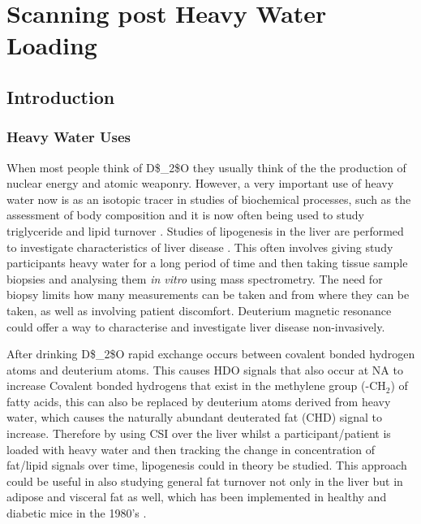 \chapter{Scanning post Heavy Water Loading}
\label{Chap:D2O}

\section{Introduction}

\subsection{Heavy Water Uses}

When most people think of \ac{D$_2$O} they usually think of the the production of nuclear energy and atomic weaponry. However, a very important use of heavy water now is as an isotopic tracer in studies of biochemical processes, such as the assessment of body composition \cite{INTERNATIONALATOMICENERGYAGENCY2011IntroductionSpectrometry} and it is now often being used to study triglyceride \cite{Strawford2004AdiposeO} and lipid turnover \cite{Wilkinson2017StableFuture}. Studies of lipogenesis in the liver are performed to investigate characteristics of liver disease \cite{Turner2003MeasurementMIDA}. This often involves giving study participants heavy water for a long period of time and then taking tissue sample biopsies and analysing them \textit{in vitro} using mass spectrometry. The need for biopsy limits how many measurements can be taken and from where they can be taken, as well as involving patient discomfort. Deuterium magnetic resonance could offer a way to characterise and investigate liver disease non-invasively. 

After drinking \ac{D$_2$O} rapid exchange occurs between covalent bonded hydrogen atoms and deuterium atoms. This causes \ac{HDO} signals that also occur at \ac{NA} to increase Covalent bonded hydrogens that exist in the methylene group (-CH$_2$) of fatty acids, this can also be replaced by deuterium atoms derived from heavy water, which causes the naturally abundant deuterated fat (CHD) signal to increase. Therefore by using \ac{CSI} over the liver whilst a participant/patient is loaded with heavy water and then tracking the change in concentration of fat/lipid signals over time, lipogenesis could in theory be studied. This approach could be useful in also studying general fat turnover not only in the liver but in adipose and visceral fat as well, which has been implemented in healthy and diabetic mice in the 1980's \cite{Brereton1986PreliminarySpectroscopy,Brereton1989TheMice}.

